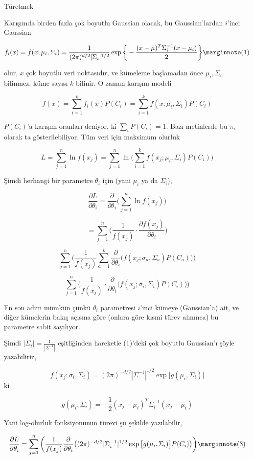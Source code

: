 \documentclass[12pt,fleqn]{article}\usepackage{../../common}
\begin{document}
Türetmek 

Karışımda birden fazla çok boyutlu Gaussian olacak, bu Gaussian'lardan
$i$'inci Gaussian

$$ 
f_i(x) = f(x;\mu_i,\Sigma_i) = 
\frac{1}{(2\pi)^{d/2} |\Sigma_i|^{1/2}} \exp 
\bigg\{
-\frac{(x-\mu)^T\Sigma_i^{-1}(x-\mu_i)}{2} 
\bigg\} 
\mlabel{1}
$$

olur, $x$ çok boyutlu veri noktasıdır, ve kümeleme başlamadan önce
$\mu_i,\Sigma_i$ bilinmez, küme sayısı $k$ bilinir. O zaman karışım modeli

$$ f(x) = \sum _{i=1}^{k} f_i(x)P(C_i) =
\sum _{i=1}^{k} f(x;\mu_i,\Sigma_i)P(C_i)
$$

$P(C_i)$'a karışım oranları deniyor, ki $\sum_i P(C_i) = 1$. Bazı
metinlerde bu $\pi_i$ olarak ta gösterilebiliyor.  Tüm veri için maksimum
olurluk

$$ 
L = \sum _{j=1}^{n} \ln f(x_j) = \sum _{j=1}^{n} \ln \bigg(
\sum _{i=1}^{k} f(x_j;\mu_i,\Sigma_i)P(C_i)
\bigg)
$$

Şimdi herhangi bir parametre $\theta_i$ için (yani $\mu_i$ ya da $\Sigma_i$), 

$$ 
\frac{\partial L}{\partial \theta_i} = 
\frac{\partial }{\partial \theta_i} 
\bigg(\sum _{j=1}^{n} \ln f(x_j) \bigg)
$$

$$ 
= \sum _{j=1}^{n} \big( \frac{1}{f(x_j)} \cdot
\frac{\partial f(x_j)}{\partial \theta_i} \big)
$$

$$ 
\sum _{j=1}^{n} \bigg(
\frac{1}{f(x_j)} \sum _{a=1}^{k} \frac{\partial }{\partial \theta_i}
\big( f(x_j;\sigma_a,\Sigma_a)P(C_a) \big)
\bigg)
$$

$$ 
\sum _{j=1}^{n} \bigg(
\frac{1}{f(x_j)} \cdot \frac{\partial }{\partial \theta_i}
\big( f(x_j;\sigma_i,\Sigma_i)P(C_i) \big)
\bigg)
$$

En son adım mümkün çünkü $\theta_i$ parametresi $i$'inci kümeye
(Gaussian'a) ait, ve diğer kümelerin bakış açısına göre (onlara göre kısmi
türev alınınca) bu parametre sabit sayılıyor. 

Şimdi $|\Sigma_i| = \frac{1}{|\Sigma^{-1}|}$ eşitliğinden hareketle
(1)'deki çok boyutlu Gaussian'ı şöyle yazabiliriz, 

$$ 
f(x_j;\sigma_i,\Sigma_i) = (2\pi)^{-d/2} |\Sigma^{-1}|^{1/2} 
\exp \big[ g(\mu_i,\Sigma_i) \big]
$$ 
ki

$$ g(\mu_i,\Sigma_i) = -\frac{1}{2}(x_j-\mu_i)^T\Sigma_i^{-1}(x_j-\mu_i) $$

Yani log-olurluk fonksiyonunun türevi şu şekilde yazılabilir,

$$ 
\frac{\partial L}{\partial \theta_i} =
\sum _{j=1}^{n} \bigg(
\frac{1}{f(x_j)} \frac{\partial }{\partial \theta_i} \big(
(2\pi)^{-d/2} |\Sigma_i^{-1}|^{1/2} \exp\big[ 
g(\mu_i,\Sigma_i) \big] P(C_i)
\big) \bigg)
\mlabel{3}
$$
\end{document}
